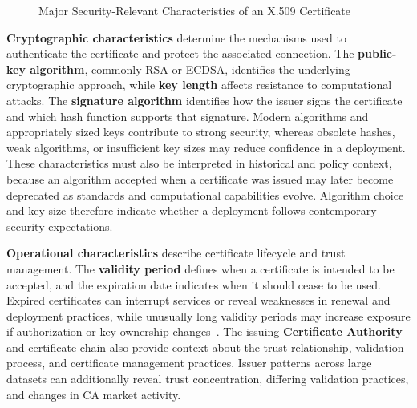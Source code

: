 \begin{figure}[H]
  \caption{Major Security-Relevant Characteristics of an X.509 Certificate}
  \label{fig:x509-security-characteristics}
\end{figure}

\textbf{Cryptographic characteristics} determine the mechanisms used to
authenticate the certificate and protect the associated connection. The
\textbf{public-key algorithm}, commonly RSA or ECDSA, identifies the underlying
cryptographic approach, while \textbf{key length} affects resistance to
computational attacks. The \textbf{signature algorithm} identifies how the
issuer signs the certificate and which hash function supports that signature.
Modern algorithms and appropriately sized keys contribute to strong security,
whereas obsolete hashes, weak algorithms, or insufficient key sizes may reduce
confidence in a deployment. These characteristics must also be interpreted in
historical and policy context, because an algorithm accepted when a certificate
was issued may later become deprecated as standards and computational
capabilities evolve. Algorithm choice and key size therefore indicate whether
a deployment follows contemporary security expectations.

\textbf{Operational characteristics} describe certificate lifecycle and trust
management. The \textbf{validity period} defines when a certificate is intended
to be accepted, and the expiration date indicates when it should cease to be
used. Expired certificates can interrupt services or reveal weaknesses in
renewal and deployment practices, while unusually long validity periods may
increase exposure if authorization or key ownership changes~\cite{ma2023stale}.
The issuing \textbf{Certificate Authority} and certificate chain also provide
context about the trust relationship, validation process, and certificate
management practices. Issuer patterns across large datasets can additionally
reveal trust concentration, differing validation practices, and changes in CA
market activity.

